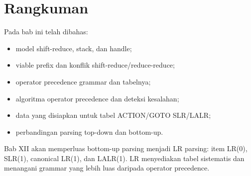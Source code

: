 \section*{Rangkuman}

Pada bab ini telah dibahas:
\begin{itemize}[leftmargin=*]
  \item model shift-reduce, stack, dan handle;
  \item viable prefix dan konflik shift-reduce/reduce-reduce;
  \item operator precedence grammar dan tabelnya;
  \item algoritma operator precedence dan deteksi kesalahan;
  \item data yang disiapkan untuk tabel ACTION/GOTO SLR/LALR;
  \item perbandingan parsing top-down dan bottom-up.
\end{itemize}

Bab XII akan memperluas bottom-up parsing menjadi LR parsing:
item LR(0), SLR(1), canonical LR(1), dan LALR(1). LR menyediakan
tabel sistematis dan menangani grammar yang lebih luas daripada
operator precedence.
